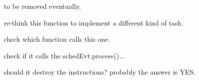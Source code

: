 \begin{DoxyRefList}
\item[\label{todo__todo000025}%
\hypertarget{todo__todo000025}{}%
Global \hyperlink{classRTSim_1_1Task_ae3668377595483e96d123e5dc0bb05be}{R\+T\+Sim\+:\+:Task\+:\+:print\+Instr\+List} () const ]to be removed eventually.  
\item[\label{todo__todo000017}%
\hypertarget{todo__todo000017}{}%
Global \hyperlink{classRTSim_1_1Task_a06c287744e3a83bd1acac7567f60ec30}{R\+T\+Sim\+:\+:Task\+:\+:reactivate} ()]re-\/think this function to implement a different kind of task.  
\item[\label{todo__todo000026}%
\hypertarget{todo__todo000026}{}%
Global \hyperlink{classRTSim_1_1Task_a5d1ceb465d71ed07ed1f7047c685a86f}{R\+T\+Sim\+:\+:Task\+:\+:refresh\+Exec} (double old\+Speed, double new\+Speed)]check which function calls this one.  
\item[\label{todo__todo000023}%
\hypertarget{todo__todo000023}{}%
Global \hyperlink{classRTSim_1_1Task_a9477a7af47247368e05f8f16b0f5a28b}{R\+T\+Sim\+:\+:Task\+:\+:schedule} ()]check if it calls the sched\+Evt.\+process()...  
\item[\label{todo__todo000019}%
\hypertarget{todo__todo000019}{}%
Global \hyperlink{classRTSim_1_1Task_a407e6d6dc7aa42b253c7767231b8343e}{R\+T\+Sim\+:\+:Task\+:\+:$\sim$\+Task} ()]should it destroy the instructions? probably the answer is Y\+ES. 
\end{DoxyRefList}